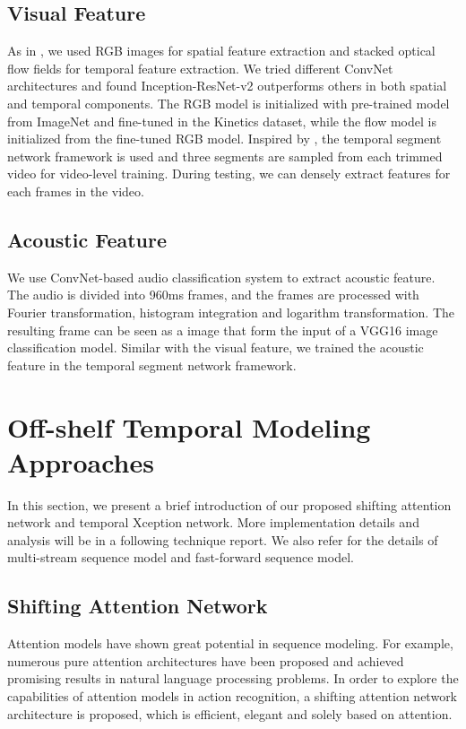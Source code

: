\documentclass[10pt,twocolumn,letterpaper]{article}
\begin{document}
\subsection{Visual Feature}
As in \cite{Twostream}, we used RGB images for spatial feature extraction and stacked optical flow fields for temporal feature extraction. We tried different ConvNet architectures and found Inception-ResNet-v2 \cite{inception4} outperforms others in both spatial and temporal components. The RGB model is initialized with pre-trained model from ImageNet and fine-tuned in the Kinetics dataset, while the flow model is initialized from the fine-tuned RGB model. Inspired by \cite{WangX16}, the temporal segment network framework is used and three segments are sampled from each trimmed video for video-level training. During testing, we can densely extract features for each frames in the video.

\subsection{Acoustic Feature}
We use ConvNet-based audio classification system \cite{audiocnn} to extract acoustic feature. The audio is divided into 960ms frames, and the frames are processed with Fourier transformation, histogram integration and logarithm transformation. The resulting frame can be seen as a  image that form the input of a VGG16 \cite{Simonyan14c} image classification model. Similar with the visual feature, we trained the acoustic feature in the temporal segment network framework.

\section{Off-shelf Temporal Modeling Approaches}

\label{sec:3}
 In this section, we present a brief introduction of our proposed shifting attention network and temporal Xception network.
 More implementation details and analysis will be in a following technique report. We also refer \cite{li2017temporal} for the details of multi-stream sequence model and fast-forward sequence model.


\subsection{Shifting Attention Network}
Attention models have shown great potential in sequence modeling. For example, numerous pure attention architectures \cite{AttentionIsAllYouNeed, SelfAttentive} have been proposed and achieved promising results in natural language processing problems. In order to explore the capabilities of attention models in action recognition, a shifting attention network architecture is proposed, which is efficient, elegant and solely based on attention.
\end{document}

